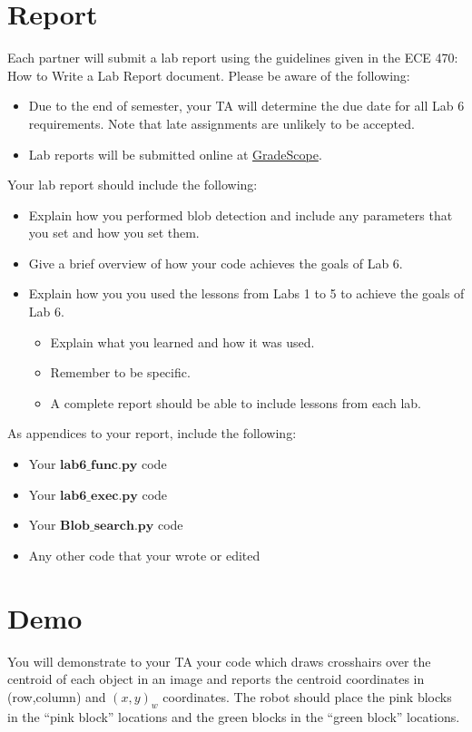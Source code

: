 \begin{itemize}
\end{itemize}

\section{Report}
Each partner will submit a lab report using the guidelines given in the ECE 470: How to Write a Lab Report document.  Please be aware of the following:
\begin{itemize}
    \item Due to the end of semester, your TA will determine the due date for all Lab 6 requirements.  Note that late assignments are unlikely to be accepted.
    \item Lab reports will be submitted online at \href{https://www.gradescope.com}{GradeScope}.
\end{itemize}
Your lab report should include the following:
\begin{itemize}
    \item Explain how you performed blob detection and include any parameters that you set and how you set them.
    \item Give a brief overview of how your code achieves the goals of Lab 6.
    \item Explain how you you used the lessons from Labs 1 to 5 to achieve the goals of Lab 6.
    \begin{itemize}
        \item Explain what you learned and how it was used.
        \item Remember to be specific.
        \item A complete report should be able to include lessons from each lab.
    \end{itemize}
    
\end{itemize}
As appendices to your report, include the following:
\begin{itemize}
    \item Your $\textbf{lab6\_func.py}$ code 
    \item Your $\textbf{lab6\_exec.py}$ code
    \item Your $\textbf{Blob\_search.py}$ code
    \item Any other code that your wrote or edited
\end{itemize}


\section{Demo}
You will demonstrate to your TA your code which draws crosshairs over the centroid of each object in an image and reports the centroid coordinates 
in (row,column) and $(x,y)_w$ coordinates.  The robot should place the pink blocks in the ``pink block'' locations and the green blocks in the ``green block'' locations.


